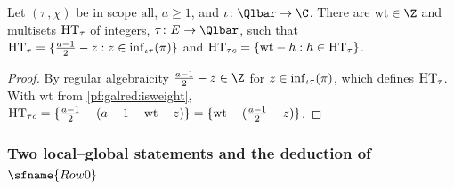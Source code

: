 \begin{corollary}\label{pf:galred:weights}
Let $(\pi,\chi)$ be in scope $\mathrm{all}$, $a\ge1$, and $\iota\colon\Qlbar\to\C$. There are $\mathrm{wt}\in\Z$ and
multisets $\mathrm{HT}_\tau$ of integers, $\tau\colon E\to\Qlbar$, such that
$\mathrm{HT}_\tau=\{\frac{a-1}2-z:z\in\operatorname{inf}_{\iota\tau}(\pi)\}$ and $\mathrm{HT}_{\tau c}=\{\mathrm{wt}-h:h\in\mathrm{HT}_\tau\}$.
\end{corollary}

\begin{proof}
By regular algebraicity $\frac{a-1}2-z\in\Z$ for $z\in\operatorname{inf}_{\iota\tau}(\pi)$, which defines $\mathrm{HT}_\tau$.
With $\mathrm{wt}$ from \cref{pf:galred:isweight}, $\mathrm{HT}_{\tau c}=\{\frac{a-1}2-(a-1-\mathrm{wt}-z)\}=
\{\mathrm{wt}-(\frac{a-1}2-z)\}$.
\end{proof}

\subsubsection{Two local--global statements and the deduction of \texorpdfstring{$\sfname{Row0}$}{Row0}}
\label{sec:pf:galred:restproof}


